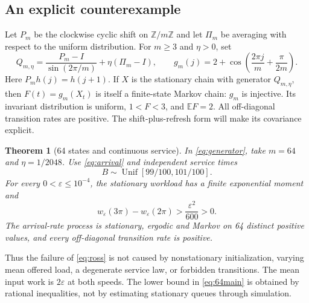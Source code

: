 \documentclass[10pt,a4paper]{amsart}
\numberwithin{equation}{section}
\newtheorem{theorem}{Theorem}[section]
\newcommand{\E}{\mathbb E}
\newcommand{\Z}{\mathbb Z}
\newcommand{\1}{\mathbf 1}
\newcommand{\eps}{\varepsilon}
\DeclareMathOperator{\Unif}{Unif}
\begin{document}
\subsection{An explicit counterexample}
Let $P_m$ be the clockwise cyclic shift on $\Z/m\Z$ and let $\Pi_m$ be averaging with respect to the uniform distribution. For $m\ge3$ and $\eta>0$, set
\begin{equation}\label{eq:generator}
 Q_{m,\eta}=\frac{P_m-I}{\sin(2\pi/m)}+\eta(\Pi_m-I),
 \qquad
 g_m(j)=2+\cos\left(\frac{2\pi j}{m}+\frac{\pi}{2m}\right).
\end{equation}
Here $P_mh(j)=h(j+1)$. If $X$ is the stationary chain with generator $Q_{m,\eta}$, then $F(t)=g_m(X_t)$ is itself a finite-state Markov chain: $g_m$ is injective. Its invariant distribution is uniform, $1<F<3$, and $\E F=2$. All off-diagonal transition rates are positive. The shift-plus-refresh form will make its covariance explicit.

\begin{theorem}[64 states and continuous service]\label{thm:64}
In \eqref{eq:generator}, take $m=64$ and $\eta=1/2048$. Use \eqref{eq:arrival} and independent service times
\begin{equation}\label{eq:uniformservice}
 B\sim\Unif[99/100,101/100].
\end{equation}
For every $0<\eps\le10^{-4}$, the stationary workload has a finite exponential moment and
\begin{equation}\label{eq:64main}
 w_\eps(3\pi)-w_\eps(2\pi)>\frac{\eps^2}{600}>0.
\end{equation}
The arrival-rate process is stationary, ergodic and Markov on 64 distinct positive values, and every off-diagonal transition rate is positive.
\end{theorem}

Thus the failure of \eqref{eq:ross} is not caused by nonstationary initialization, varying mean offered load, a degenerate service law, or forbidden transitions. The mean input work is $2\eps$ at both speeds. The lower bound in \eqref{eq:64main} is obtained by rational inequalities, not by estimating stationary queues through simulation.
\end{document}
